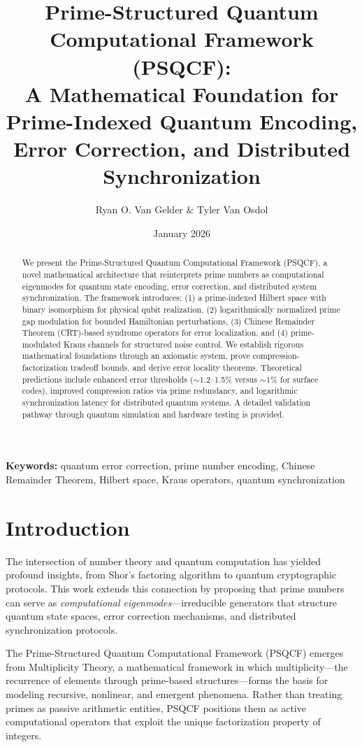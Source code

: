 \documentclass[12pt,a4paper]{article}
\title{\textbf{Prime-Structured Quantum Computational Framework (PSQCF): \\[0.3em] A Mathematical Foundation for Prime-Indexed Quantum Encoding, Error Correction, and Distributed Synchronization}}
\author[1]{Ryan O. Van Gelder \& Tyler Van Osdol}
\affil[1]{Multiplicity Theory Research Institute, Worthington, Ohio, USA}
\date{January 2026}
\begin{document}
\maketitle

\begin{abstract}
We present the Prime-Structured Quantum Computational Framework (PSQCF), a novel mathematical architecture that reinterprets prime numbers as computational eigenmodes for quantum state encoding, error correction, and distributed system synchronization. The framework introduces: (1) a prime-indexed Hilbert space with binary isomorphism for physical qubit realization, (2) logarithmically normalized prime gap modulation for bounded Hamiltonian perturbations, (3) Chinese Remainder Theorem (CRT)-based syndrome operators for error localization, and (4) prime-modulated Kraus channels for structured noise control. We establish rigorous mathematical foundations through an axiomatic system, prove compression-factorization tradeoff bounds, and derive error locality theorems. Theoretical predictions include enhanced error thresholds ($\sim$1.2--1.5\% versus $\sim$1\% for surface codes), improved compression ratios via prime redundancy, and logarithmic synchronization latency for distributed quantum systems. A detailed validation pathway through quantum simulation and hardware testing is provided.
\end{abstract}

\noindent\textbf{Keywords:} quantum error correction, prime number encoding, Chinese Remainder Theorem, Hilbert space, Kraus operators, quantum synchronization
\newpage
\tableofcontents
\newpage

\section{Introduction}

The intersection of number theory and quantum computation has yielded profound insights, from Shor's factoring algorithm to quantum cryptographic protocols. This work extends this connection by proposing that prime numbers can serve as \emph{computational eigenmodes}---irreducible generators that structure quantum state spaces, error correction mechanisms, and distributed synchronization protocols.

The Prime-Structured Quantum Computational Framework (PSQCF) emerges from Multiplicity Theory, a mathematical framework in which multiplicity---the recurrence of elements through prime-based structures---forms the basis for modeling recursive, nonlinear, and emergent phenomena. Rather than treating primes as passive arithmetic entities, PSQCF positions them as active computational operators that exploit the unique factorization property of integers.
\end{document}
